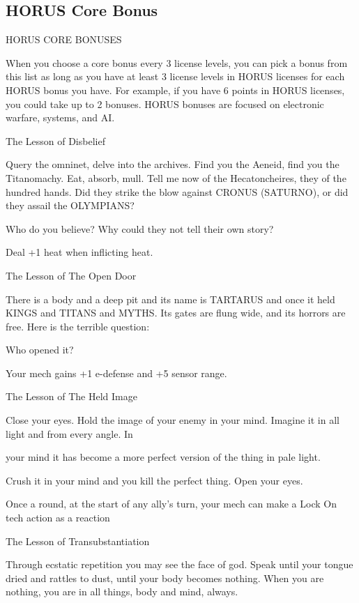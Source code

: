 \subsection{HORUS Core Bonus}

                                      HORUS CORE BONUSES

When you choose a core bonus every 3 license levels, you can pick a bonus from this list as long
as you have at least 3 license levels in HORUS licenses for each HORUS bonus you have. For
example, if you have 6 points in HORUS licenses, you could take up to 2 bonuses. HORUS
bonuses are focused on electronic warfare, systems, and AI.


The Lesson of Disbelief

Query the omninet, delve into the archives. Find you the Aeneid, find you the Titanomachy. Eat, absorb,
mull. Tell me now of the Hecatoncheires, they of the hundred hands. Did they strike the blow against
CRONUS (SATURNO), or did they assail the OLYMPIANS?

Who do you believe? Why could they not tell their own story?

Deal +1 heat when inflicting heat.


The Lesson of The Open Door

There is a body and a deep pit and its name is TARTARUS and once it held KINGS and TITANS and
MYTHS. Its gates are flung wide, and its horrors are free. Here is the terrible question:

Who opened it?

Your mech gains +1 e-defense and +5 sensor range.


The Lesson of The Held Image

Close your eyes. Hold the image of your enemy in your mind. Imagine it in all light and from every angle. In

your mind it has become a more perfect version of the thing in pale light.

Crush it in your mind and you kill the perfect thing. Open your eyes.

Once a round, at the start of any ally's turn, your mech can make a Lock On tech action as a
reaction


The Lesson of Transubstantiation

Through ecstatic repetition you may see the face of god. Speak until your tongue dried and rattles to dust,
until your body becomes nothing. When you are nothing, you are in all things, body and mind, always.

